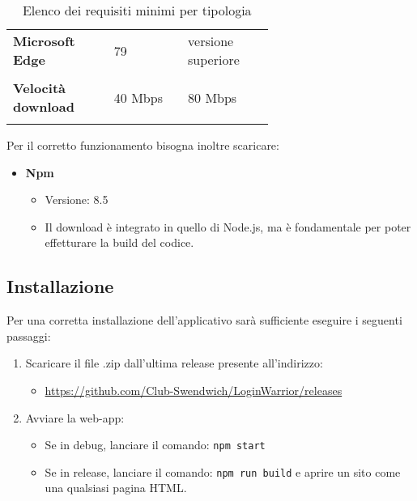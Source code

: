 {\begin{longtable}{>{\raggedright\arraybackslash}m{0.24\linewidth}m{0.20\linewidth}m{0.20\linewidth}}
    \rowcolor[RGB]{233, 245, 206}
    \textbf{Microsoft Edge} & 79 & versione superiore \\

    \rowcolor[RGB]{47, 106, 73}
    \multicolumn{3}{>{\centering\arraybackslash}m{0.693\linewidth}}{\textcolor{white}{\textbf{Connessione}}}\\

    \rowcolor[RGB]{216, 235, 171}
    \textbf{Velocità download} & 40 Mbps & 80 Mbps \\

    \caption{Elenco dei requisiti minimi per tipologia}
\end{longtable}
}

Per il corretto funzionamento bisogna inoltre scaricare:
\begin{itemize}
    \item \textbf{Npm}
    \begin{itemize}
        \item Versione: 8.5
        \item Il download è integrato in quello di Node.js, ma è fondamentale per poter effetturare la build del codice.
    \end{itemize}
\end{itemize}

\subsection{Installazione}

Per una corretta installazione dell'applicativo sarà sufficiente eseguire i seguenti passaggi:

\begin{enumerate}
    \item Scaricare il file .zip dall'ultima release presente all'indirizzo:
    \begin{itemize}
        \item \href{https://github.com/Club-Swendwich/LoginWarrior/releases}{https://github.com/Club-Swendwich/LoginWarrior/releases}
    \end{itemize}
    \item Avviare la web-app:
    \begin{itemize}
        \item Se in debug, lanciare il comando: \texttt{npm start}
        \item Se in release, lanciare il comando: \texttt{npm run build} e aprire un sito come una qualsiasi pagina HTML.
    \end{itemize}
\end{enumerate}
